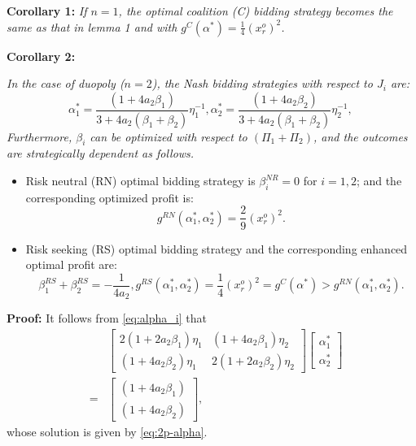 \documentclass[conference]{IEEEtran}
\begin{document}
\noindent  \textbf{Corollary 1:} {\it If $n=1$, the optimal coalition (C) bidding strategy becomes the same as that in lemma 1 and with $g^C(\alpha^*)=\frac{1}{4} (x_r^o)^2$.}

\noindent  \textbf{Corollary 2:} {\it In the case of duopoly ($n=2$), the Nash bidding strategies with respect to $J_i$ are:
\begin{subequations}
\label{eq:2p-alpha}
\begin{equation}
\alpha_1^*= \frac{(1+4a_2\beta_1)}{3+4a_2(\beta_1+\beta_2)}\eta_1^{-1}, 
\label{eq:2p-alpha1}
\end{equation} 
\begin{equation}
 \alpha_2^*= \frac{(1+4a_2\beta_2)}{3+4a_2(\beta_1+\beta_2)}\eta_2^{-1}, \, 
\label{eq:2p-alpha2}
\end{equation} 
\end{subequations}
Furthermore, $\beta_i$ can be optimized with respect to $(\Pi_1+\Pi_2)$, and the outcomes are strategically dependent as follows. 
\begin{itemize}
\item Risk neutral (RN) optimal bidding strategy is $\beta_i^{NR}=0$ for $i=1,2$; and the corresponding optimized profit is:
\begin{equation}
g^{RN}(\alpha_1^*, \alpha_2^*)  =  \frac{2}{9}(x_r^o)^2. 
\label{eq:2p-neutral}
\end{equation} 
\item Risk seeking (RS) optimal bidding strategy  and the corresponding enhanced optimal profit are:
\begin{subequations}
\label{eq:2p-RS}
\begin{equation}
\beta_1^{RS}+\beta_2^{RS}=-\frac{1}{4a_2},
\label{eq:2p-RS-beta}
\end{equation} 
\begin{equation}
g^{RS}(\alpha_1^*,\alpha_2^*) = \frac{1}{4}(x_r^o)^2 = g^C(\alpha^*)   > g^{RN}(\alpha_1^*, \alpha_2^*). 
\label{eq:2p-RS-g}
\end{equation} 
\end{subequations}
\end{itemize} }

 \noindent \textbf{Proof:} It follows from \eqref{eq:alpha_i} that 
 \begin{eqnarray*}
  && \begin{bmatrix} 2(1+2a_2 \beta_1)\eta_1 & (1+4a_2\beta_1)\eta_2  \\ (1+4a_2\beta_2)\eta_1  & 2(1+2a_2 \beta_2)\eta_2  \end{bmatrix}   
  \begin{bmatrix}  \alpha_1^* \\ \alpha_2^* \end{bmatrix}  \\
  & = &  \begin{bmatrix}  (1+4a_2\beta_1) \\ (1+4a_2\beta_2)\end{bmatrix},
      \end{eqnarray*}
 whose solution is given by \eqref{eq:2p-alpha}.
\end{document}
